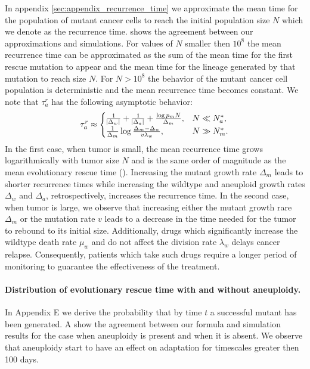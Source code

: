 \documentclass[12pt]{extarticle}
\begin{document}
In appendix \ref{sec:appendix_recurrence_time} we approximate the mean time for the population of mutant cancer cells to reach the initial population size $N$ which we denote as the recurrence time.  shows the agreement between our approximations and simulations. For values of $N$ smaller then $10^8$ the mean recurrence time can be approximated as the sum of the mean time for the first rescue mutation to appear and the mean time for the lineage generated by that mutation to reach size $N$. For $N>10^8$ the behavior of the mutant cancer cell population is deterministic and the mean recurrence time becomes constant. We note that $\tau_a^r$ has the following asymptotic behavior:
\begin{equation} \label{eq:AsymptoticTimeRulesRecurrence}
\tau_a^r \approx \begin{cases}
   \frac{1}{ \abs{\Delta_w}}+\frac{1}{ \abs{\Delta_a}}+\frac{\log p_mN}{\Delta_m} ,&
 N \ll N_a^* ,\\ 
  \frac{1}{\Delta_m}\log\frac{\Delta_m-\Delta_w}{v\lambda_w}  ,&
  N \gg N_m^* .
  \end{cases}
\end{equation}
In the first case, when tumor is small, the mean recurrence time grows logarithmically with tumor size $N$ and is the same order of magnitude as the mean evolutionary rescue time (). Increasing the mutant growth rate $\Delta_m$ leads to shorter recurrence times while increasing the wildtype and aneuploid growth rates $\Delta_w$ and $\Delta_a$, retrospectively, increases the recurrence time. In the second case, when tumor is large, we observe that increasing either the mutant growth rare $\Delta_m$ or the mutation rate $v$ leads to a decrease in the time needed for the tumor to rebound to its initial size. Additionally, drugs which significantly increase the wildtype death rate $\mu_w$ and do not affect the division rate $\lambda_w$ delays cancer relapse. Consequently, patients which take such drugs require a longer period of monitoring to guarantee the effectiveness of the treatment.
\paragraph{Distribution of evolutionary rescue time with and without aneuploidy.}

In Appendix E we derive the probability that by time $t$ a successful mutant has been generated. A show the agreement between our formula and simulation results for the case when aneuploidy is present and when it is absent.  We observe that aneuploidy start to have an effect on adaptation for timescales greater then 100 days.
\end{document}
